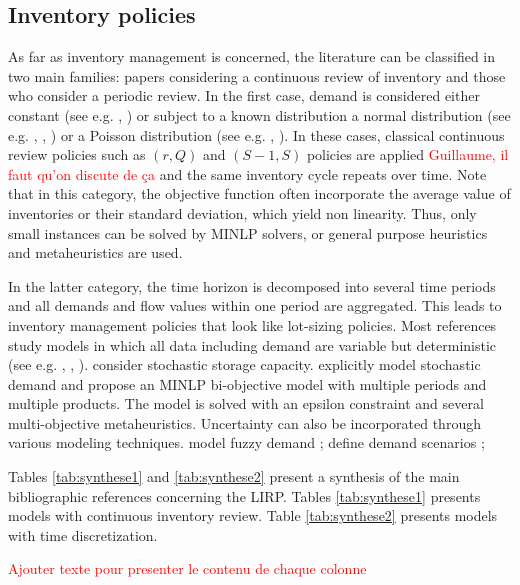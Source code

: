 \documentclass[a4paper,10pt]{article}
\begin{document}
\begin{linenumbers}
\subsection{Inventory policies}
\label{sec:i}

As far as inventory management is concerned, the literature can be classified in two main families: papers considering a continuous review of inventory and those who consider a periodic review. 
In the first case, demand is considered either constant (see e.g. \cite{AhmSed2012}, \cite{Deng2016}) or subject to a known distribution a 
normal distribution (see e.g. \cite{Nekooghadirli2014}, \cite{Zhalechian2016}, \cite{Saragih2018}) or a Poisson distribution (see e.g. \cite{Asadi2018}, \cite{HabibiAS2018}). In these cases, classical continuous review policies such as $(r,Q)$ and $(S-1,S)$ policies are applied \textcolor{red}{Guillaume, il faut qu'on discute de ça} and the same inventory cycle repeats over time. Note that in this category, the objective function often incorporate the average value of inventories or their standard deviation, which yield non linearity. Thus, only small instances can be solved by MINLP solvers, or general purpose heuristics and metaheuristics are used. 


In the latter category, the time horizon is decomposed into several time periods and all demands and flow values within one period are aggregated. This leads to inventory management policies that look like lot-sizing policies. Most references study models in which all data including demand are variable but deterministic (see e.g. \cite{Guerrero2013}, \cite{Zhang2014}, \cite{Ghorbani2016}). 
\cite{Vahdani2018} consider stochastic storage capacity. 
\cite{Rayat2017} explicitly model stochastic demand and propose an MINLP bi-objective model with multiple periods and multiple products. The model is solved with an epsilon constraint and several multi-objective metaheuristics. 
Uncertainty can also be incorporated through various modeling techniques. 
\cite{ChenChenSunLiu2014, TavakkoliIFAC2016} model fuzzy demand ; \cite{Bashiri2018} define demand scenarios ; 



Tables \ref{tab:synthese1} and \ref{tab:synthese2} present a synthesis of the main bibliographic references concerning the LIRP. 
Tables \ref{tab:synthese1} presents models with continuous inventory review. 
Table \ref{tab:synthese2} presents models with time discretization. 

\textcolor{red}{Ajouter texte pour presenter le contenu de chaque colonne}


\end{linenumbers}
\end{document}
